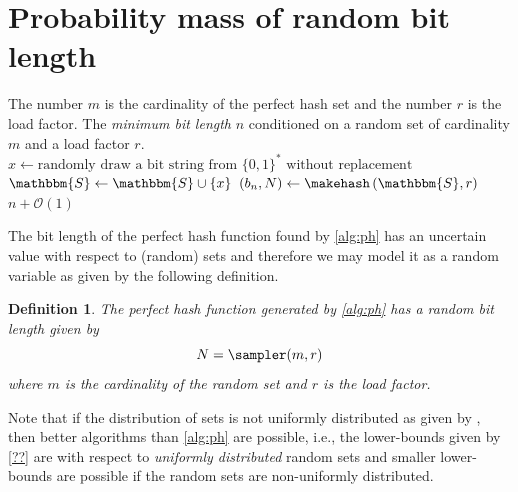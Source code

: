 \documentclass[hidelinks,11pt,final]{article}
\newcommand{\envnumstyle}{section}
\theoremstyle{plain}
\newtheorem{definition}{Definition}[\envnumstyle]
\begin{document}

\appendix
\appendixpage
\addappheadtotoc
\section{Probability mass of random bit length}
\begin{algorithm}
    \caption{Bit length sampler of the cryptographic perfect hash function}
    \label{alg:sampler}
    \KwIn
    {
        The number $m$ is the cardinality of the perfect hash set and
        the number $r$ is the load factor.
    }
    \KwOut
    {
        The \emph{minimum bit length} $n$ conditioned on a random set of cardinality $m$ and a load factor $r$.
    }
    {
        {
            $x \gets \text{randomly draw a bit string from $\{0,1\}^{*}$ without replacement}$\;
            $\mathbbm{S} \gets \mathbbm{S} \cup \{x\}$\;
        }    
        $(b_n,N) \gets \makehash\left(\mathbbm{S}, r\right)$\;
        \Return $n + \mathcal{O}(1)$\;
    }
\end{algorithm}
The bit length of the perfect hash function found by \cref{alg:ph} has an uncertain value with respect to (random) sets and therefore we may model it as a random variable as given by the following definition.
\begin{definition}
\label{def:N_rv}
The perfect hash function generated by \cref{alg:ph} has a random bit length given by
\begin{equation}
    N = \sampler(m,r)
\end{equation}
where $m$ is the cardinality of the random set and $r$ is the load factor.
\end{definition}
Note that if the distribution of sets is not uniformly distributed as given by 
\sampler, then better algorithms than \cref{alg:ph} are possible, i.e., the 
lower-bounds given by \cref{??} are with respect to \emph{uniformly distributed}
random sets and smaller lower-bounds are possible if the random sets are 
non-uniformly distributed.
\end{document}
